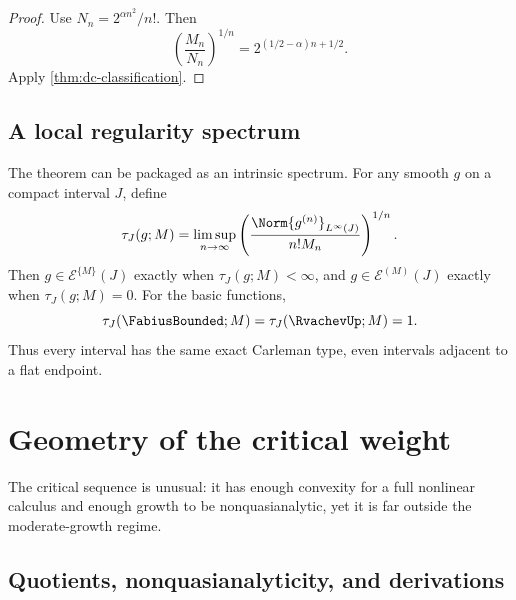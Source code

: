\documentclass[11pt,a4paper]{article}
\theoremstyle{definition}
\theoremstyle{remark}
\newcommand{\Roumieu}[1]{\mathcal{E}^{\{#1\}}}
\newcommand{\Beurling}[1]{\mathcal{E}^{(#1)}}
\begin{document}
\begin{proof}
Use $N_n=2^{\alpha n^2}/n!$.  Then
\[
 \left(\frac{M_n}{N_n}\right)^{1/n}
 =2^{(1/2-\alpha)n+1/2}.
\]
Apply \cref{thm:dc-classification}.
\end{proof}

\subsection{A local regularity spectrum}

The theorem can be packaged as an intrinsic spectrum.  For any smooth $g$ on a
compact interval $J$, define
\begin{equation}
  \tau_J(g;M)=
  \limsup_{n\to\infty}
  \left(\frac{\Norm{g^{(n)}}_{L^\infty(J)}}{n!M_n}\right)^{1/n}.
  \label{eq:carleman-type}
\end{equation}
Then $g\in\Roumieu{M}(J)$ exactly when $\tau_J(g;M)<\infty$, and
$g\in\Beurling{M}(J)$ exactly when $\tau_J(g;M)=0$.  For the basic functions,
\begin{equation}
  \tau_J(\FabiusBounded;M)=\tau_J(\RvachevUp;M)=1.
  \label{eq:type-one}
\end{equation}
Thus every interval has the same exact Carleman type, even intervals adjacent to a
flat endpoint.

\section{Geometry of the critical weight}
\label{sec:weight-geometry}

The critical sequence is unusual: it has enough convexity for a full nonlinear
calculus and enough growth to be nonquasianalytic, yet it is far outside the
moderate-growth regime.

\subsection{Quotients, nonquasianalyticity, and derivations}
\end{document}
